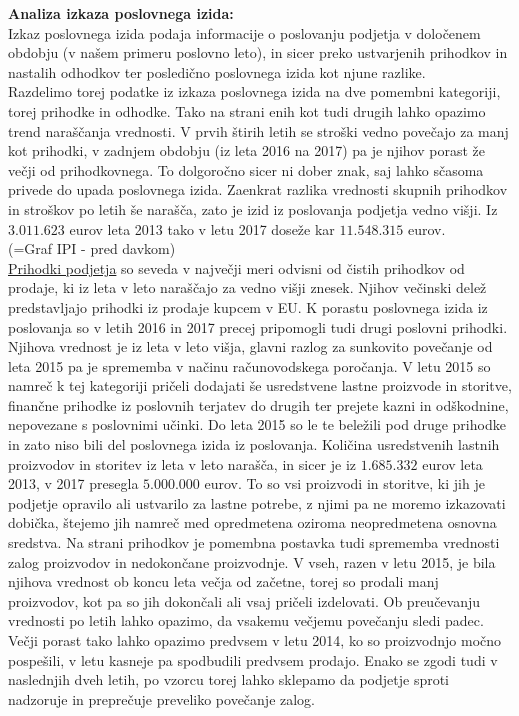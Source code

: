 \documentclass[12pt,a4paper]{amsart}
\theoremstyle{definition} %
\theoremstyle{plain} %
\begin{document}
\textbf{Analiza izkaza poslovnega izida:}\\
Izkaz poslovnega izida podaja informacije o poslovanju podjetja v določenem obdobju (v našem primeru poslovno leto), in sicer preko ustvarjenih prihodkov in nastalih odhodkov ter posledično poslovnega izida kot njune razlike. \\
Razdelimo torej podatke iz izkaza poslovnega izida na dve pomembni kategoriji, torej prihodke in odhodke. Tako na strani enih kot tudi drugih lahko opazimo trend naraščanja vrednosti. V prvih štirih letih se stroški vedno povečajo za manj kot prihodki, v zadnjem obdobju (iz leta 2016 na 2017) pa je njihov porast že večji od prihodkovnega. To dolgoročno sicer ni dober znak, saj lahko sčasoma privede do upada poslovnega izida. Zaenkrat razlika vrednosti skupnih prihodkov in stroškov po letih še  narašča, zato je izid iz poslovanja podjetja vedno višji. Iz $3.011.623$ eurov leta 2013 tako v letu 2017 doseže kar $11.548.315$ eurov.\\
(=Graf IPI - pred davkom)\\
\underline{Prihodki podjetja} so seveda v največji meri odvisni od čistih prihodkov od prodaje, ki iz leta v leto naraščajo za vedno višji znesek. Njihov večinski delež predstavljajo prihodki iz prodaje kupcem v EU. K porastu poslovnega izida iz poslovanja so v letih 2016 in 2017 precej pripomogli tudi drugi poslovni prihodki. Njihova vrednost je iz leta v leto višja, glavni razlog za sunkovito povečanje od leta 2015 pa je sprememba v načinu računovodskega poročanja. V letu 2015 so namreč k tej kategoriji pričeli dodajati še usredstvene lastne proizvode in storitve, finančne prihodke iz poslovnih terjatev do drugih ter prejete kazni in odškodnine, nepovezane s poslovnimi učinki. Do leta 2015 so le te beležili pod druge prihodke in zato niso bili del poslovnega izida iz poslovanja. Količina usredstvenih lastnih proizvodov in storitev iz leta v leto narašča, in sicer je iz $1.685.332$ eurov leta 2013, v 2017 presegla $5.000.000$ eurov. To so vsi proizvodi in storitve, ki jih je podjetje opravilo ali ustvarilo za lastne potrebe, z njimi pa ne moremo izkazovati dobička, štejemo jih namreč med opredmetena oziroma neopredmetena osnovna sredstva. Na strani prihodkov je pomembna postavka tudi sprememba vrednosti zalog proizvodov in nedokončane proizvodnje. V vseh, razen v letu 2015, je bila njihova vrednost ob koncu leta večja od začetne, torej so prodali manj proizvodov, kot pa so jih dokončali ali vsaj pričeli izdelovati. Ob preučevanju vrednosti po letih lahko opazimo, da vsakemu večjemu povečanju sledi padec. Večji porast tako lahko opazimo predvsem v letu 2014, ko so proizvodnjo močno pospešili, v letu kasneje pa spodbudili predvsem prodajo. Enako se zgodi tudi v naslednjih dveh letih, po vzorcu torej lahko sklepamo da podjetje sproti nadzoruje in preprečuje preveliko povečanje zalog.\\%
\end{document}
